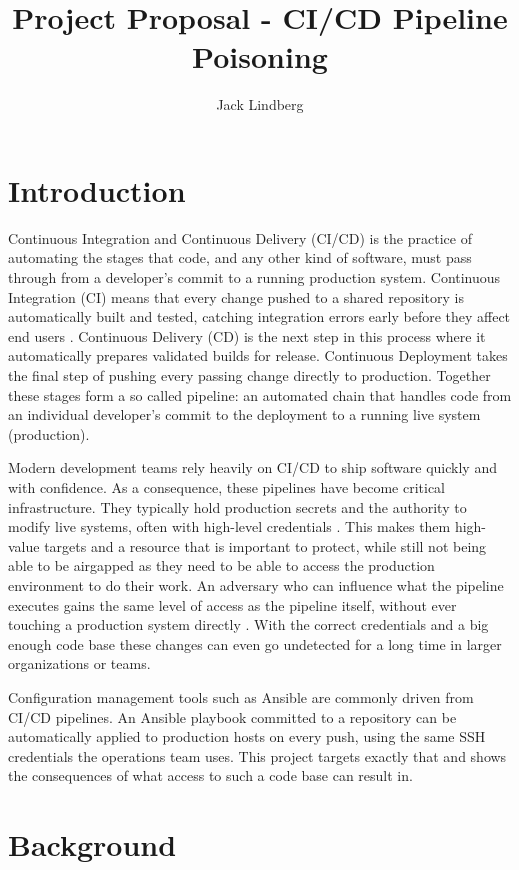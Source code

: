 \documentclass{article}
\title{Project Proposal - CI/CD Pipeline Poisoning}
\author{Jack Lindberg}
\begin{document}
\maketitle

\section{Introduction}

Continuous Integration and Continuous Delivery (CI/CD) is the practice of automating the stages that code, and any other kind of software, must pass through from a developer's commit to a running production system. Continuous Integration (CI) means that every change pushed to a shared repository is automatically built and tested, catching integration errors early before they affect end users \cite{fowlerCI}. Continuous Delivery (CD) is the next step in this process where it automatically prepares validated builds for release. Continuous Deployment takes the final step of pushing every passing change directly to production. Together these stages form a so called pipeline: an automated chain that handles code from an individual developer's commit to the deployment to a running live system (production).

Modern development teams rely heavily on CI/CD to ship software quickly and with confidence. As a consequence, these pipelines have become critical infrastructure. They typically hold production secrets and the authority to modify live systems, often with high-level credentials \cite{owaspPPE5}. This makes them high-value targets and a resource that is important to protect, while still not being able to be airgapped as they need to be able to access the production environment to do their work. An adversary who can influence what the pipeline executes gains the same level of access as the pipeline itself, without ever touching a production system directly \cite{owaspPPE}. With the correct credentials and a big enough code base these changes can even go undetected for a long time in larger organizations or teams.

Configuration management tools such as Ansible \cite{ansibleDocs} are commonly driven from CI/CD pipelines. An Ansible playbook committed to a repository can be automatically applied to production hosts on every push, using the same SSH credentials the operations team uses. This project targets exactly that and shows the consequences of what access to such a code base can result in.

\section{Background}
\end{document}
